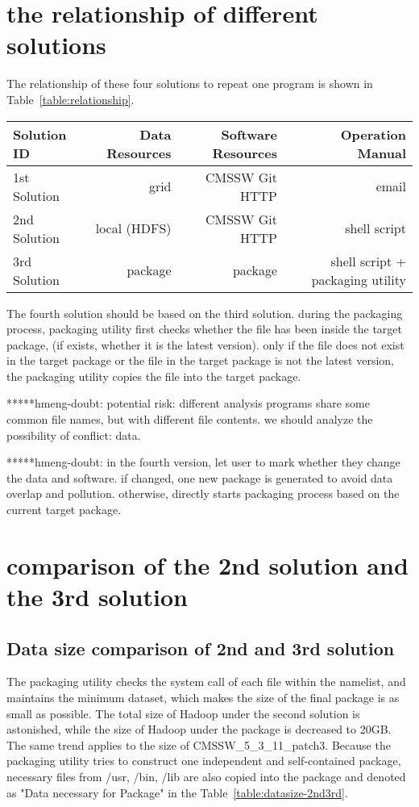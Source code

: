 \documentclass{acm_proc_article-sp}
\begin{document}
\section{the relationship of different solutions}
The relationship of these four solutions to repeat one program is shown in Table~\ref{table:relationship}.

\begin{table*}
    \centering
    \begin{tabular}{|l|r|r|r|}
        \hline
        Solution ID & Data Resources & Software Resources & Operation Manual \\ \hline
        1st Solution & grid & CMSSW Git HTTP & email \\ \hline
        2nd Solution & local (HDFS) & CMSSW Git HTTP & shell script \\ \hline
        3rd Solution & package & package & shell script + packaging utility \\ \hline
    \end{tabular}
    \caption{The relationship of different solutions}
    \label{table:relationship}
\end{table*}

The fourth solution should be based on the third solution. during the packaging process, packaging utility first checks whether the file has been inside the target package, (if exists, whether it is the latest version). only if the file does not exist in the target package or the file in the target package is not the latest version, the packaging utility copies the file into the target package.

*****hmeng-doubt: potential risk: different analysis programs share some common file names, but with different file contents. we should analyze the possibility of conflict: data.

*****hmeng-doubt: in the fourth version, let user to mark whether they change the data and software. if changed, one new package is generated to avoid data overlap and pollution. otherwise, directly starts packaging process based on the current target package. 

\section{comparison of the 2nd solution and the 3rd solution}
\subsection{ Data size comparison of 2nd and 3rd solution}
The packaging utility checks the system call of each file within the namelist, and maintains the minimum dataset, which makes the size of the final package is as small as possible. The total size of Hadoop under the second solution is astonished, while the size of Hadoop under the package is decreased to 20GB. The same trend applies to the size of CMSSW\_5\_3\_11\_patch3. Because the packaging utility tries to construct one independent and self-contained package, necessary files  from /usr, /bin, /lib are also copied into the package and denoted as "Data necessary for Package" in the Table~\ref{table:datasize-2nd3rd}.
\end{document}
